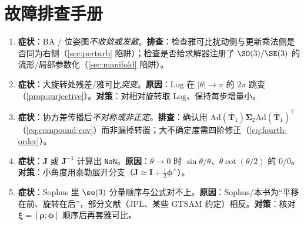 \section*{故障排查手册}
\begin{enumerate}
  \item \textbf{症状}：BA / 位姿图\emph{不收敛或发散}。\textbf{排查}：检查雅可比扰动侧与更新乘法侧是否同为右侧（\cref{sec:perturb} 陷阱）；检查是否给求解器注册了 $\SO(3)/\SE(3)$ 的流形/局部参数化（\cref{sec:manifold} 陷阱）。
  \item \textbf{症状}：大旋转处残差/雅可比\emph{突变}。\textbf{原因}：$\mathrm{Log}$ 在 $|\theta|\to\pi$ 的 $2\pi$ 跳变（\cref{prop:surjective}）。\textbf{对策}：对相对旋转取 $\mathrm{Log}$、保持每步增量小。
  \item \textbf{症状}：协方差传播后\emph{不对称或非正定}。\textbf{排查}：确认用 $\mathrm{Ad}(\bar{\mathbf{T}}_1)\boldsymbol{\Sigma}_2\mathrm{Ad}(\bar{\mathbf{T}}_1)^\top$（\cref{eq:compound-cov}）而非漏掉转置；大不确定度需四阶修正（\cref{eq:fourth-order}）。
  \item \textbf{症状}：$\mathbf{J}$ 或 $\mathbf{J}^{-1}$ 计算出 \texttt{NaN}。\textbf{原因}：$\theta\to0$ 时 $\sin\theta/\theta$、$\theta\cot(\theta/2)$ 的 $0/0$。\textbf{对策}：小角度用泰勒展开分支（$\mathbf{J}\approx\mathbf{I}+\tfrac12\boldsymbol{\phi}^\wedge$）。
  \item \textbf{症状}：Sophus 里 $\se(3)$ 分量顺序与公式对不上。\textbf{原因}：Sophus/本书为“平移在前、旋转在后”，部分文献（JPL、某些 GTSAM 约定）相反。\textbf{对策}：核对 $\boldsymbol{\xi}=[\boldsymbol{\rho};\boldsymbol{\phi}]$ 顺序后再套雅可比。
\end{enumerate}
